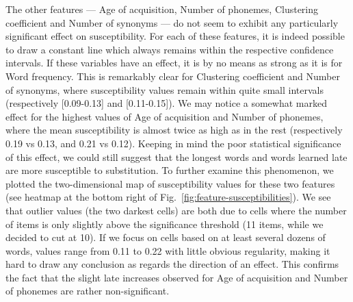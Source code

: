 The other features --- Age of acquisition, Number of phonemes, Clustering coefficient and Number of synonyms --- do not seem to exhibit any particularly significant effect on susceptibility.
For each of these features, it is indeed possible to draw a constant line which always remains within the respective confidence intervals.
If these variables have an effect, it is by no means as strong as it is for Word frequency.
This is remarkably clear for Clustering coefficient and Number of synonyms, where susceptibility values remain within quite small intervals (respectively [0.09-0.13] and [0.11-0.15]).
We may notice a somewhat marked effect for the highest values of Age of acquisition and Number of phonemes, where the mean susceptibility is almost twice as high as in the rest (respectively 0.19 vs 0.13, and 0.21 vs 0.12).
Keeping in mind the poor statistical significance of this effect, we could still suggest that the longest words and words learned late are more susceptible to substitution.
To further examine this phenomenon, we plotted the two-dimensional map of susceptibility values for these two features (see heatmap at the bottom right of Fig.~\ref{fig:feature-susceptibilities}).
We see that outlier values (the two darkest cells) are both due to cells where the number of items is only slightly above the significance threshold (11 items, while we decided to cut at 10).
If we focus on cells based on at least several dozens of words, values range from 0.11 to 0.22 with little obvious regularity, making it hard to draw any conclusion as regards the direction of an effect.
This confirms the fact that the slight late increases observed for Age of acquisition and Number of phonemes are rather non-significant.


